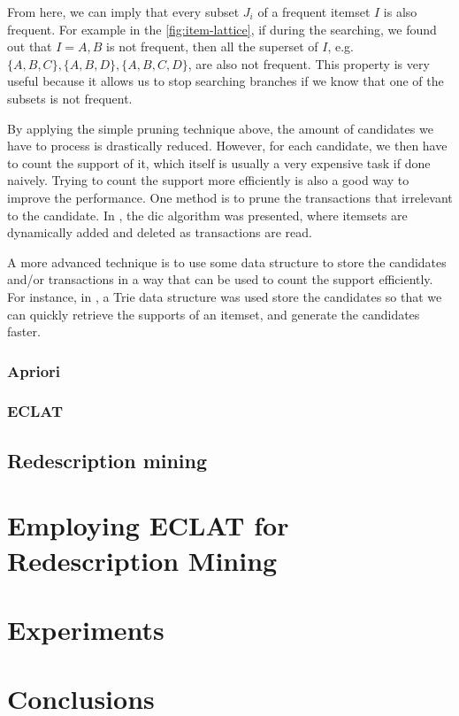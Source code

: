 From here, we can imply that every subset $J_i$ of a frequent itemset $I$ is also frequent.
For example in the \autoref{fig:item-lattice}, if during the searching, we found out that $I = {A, B}$ is not frequent, then all the superset of $I$, e.g. $\{A, B, C\}, \{A, B , D\}, \{A, B , C, D\}$, are also not frequent.
This property is very useful because it allows us to stop searching branches if we know that one of the subsets is not frequent.

By applying the simple pruning technique above, the amount of candidates we have to process is drastically reduced.
However, for each candidate, we then have to count the support of it, which itself is usually a very expensive task if done naively.
Trying to count the support more efficiently is also a good way to improve the performance.
One method is to prune the transactions that irrelevant to the candidate.
In \citep{brin_et_al_1997}, the \ac{dic} algorithm was presented, where itemsets are dynamically added and deleted as transactions are read.

A more advanced technique is to use some data structure to store the candidates and/or transactions in a way that can be used to count the support efficiently.
For instance, in \citep{bodon2003fast}, a Trie data structure was used store the candidates so that we can quickly retrieve the supports of an itemset, and generate the candidates faster.

\subsection{Apriori}
\subsection{ECLAT}

\section{Redescription mining}


\chapter{Employing ECLAT for Redescription Mining}
\label{cha:employment}

\chapter{Experiments}
\label{cha:experiments}

\chapter{Conclusions}
\label{cha:conclusions}
